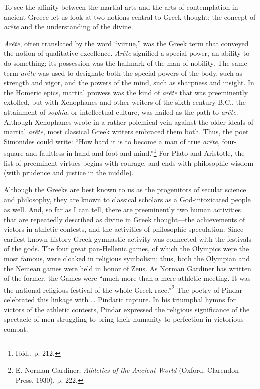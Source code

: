 To see the affinity between the martial arts and the arts of contemplation in ancient Greece let us look at two notions central to Greek thought: the concept of \emph{ar\^{e}te} and the understanding of the divine. 

\emph{Ar\^{e}te}, often translated by the word ``virtue,'' was the Greek term that conveyed the notion of qualitative excellence. \emph{Ar\^{e}te} signified a special power, an ability to do something; its possession was the hallmark of the man of nobility. The same term \emph{ar\^{e}te} was used to designate both the special powers of the body, such as strength and vigor, and the powers of the mind, such as sharpness and insight. In the Homeric epics, martial prowess was the kind of \emph{ar\^{e}te} that was preeminently extolled, but with Xenophanes and other writers of the sixth century B.C., the attainment of \emph{sophia}, or intellectual culture, was hailed as the path to \emph{ar\^{e}te}. Although Xenophanes wrote in a rather polemical vein against the older ideals of martial \emph{ar\^{e}te}, most classical Greek writers embraced them both. Thus, the poet Simonides could write: ``How hard it is to become a man of true \emph{ar\^{e}te}, four-square and faultless in hand and foot and mind.''\footnote{Ibid., p. 212.} For Plato and Aristotle, the list of preeminent virtues begins with courage, and ends with philosophic wisdom (with prudence and justice in the middle). 

Although the Greeks are best known to us as the progenitors of secular science and philosophy, they are known to classical scholars as a God-intoxicated people as well. And, so far as I can tell, there are preeminently two human activities that are repeatedly described as divine in Greek thought---the achievements of victors in athletic contests, and the activities of philosophic speculation. Since earliest known history Greek gymnastic activity was connected with the festivals of the gods. The four great pan-Hellenic games, of which the Olympics were the most famous, were cloaked in religious symbolism; thus, both the Olympian and the Nemean games were held in honor of Zeus. As Norman Gardiner has written of the former, the Games were ``much more than a mere athletic meeting. It was the national religious festival of the whole Greek race.''\footnote{E. Norman Gardiner, \emph{Athletics of the Ancient World} (Oxford: Clarendon Press, 1930), p. 222.} The poetry of Pindar celebrated this linkage with \ldots{} Pindaric rapture. In his triumphal hymns for victors of the athletic contests, 
\newline{}
Pindar expressed the religious significance of the spectacle of men struggling to bring their humanity to perfection in victorious combat.

